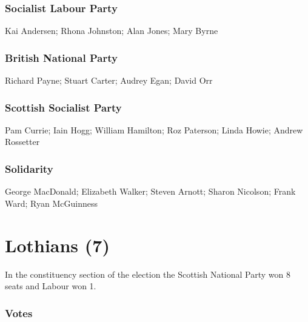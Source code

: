 \begin{resultsiii}
\subsubsection*{Socialist Labour Party}
Kai Andersen; Rhona Johnston; Alan Jones; Mary Byrne
\subsubsection*{British National Party}
Richard Payne; Stuart Carter; Audrey Egan; David Orr
\subsubsection*{Scottish Socialist Party}
Pam Currie; Iain Hogg; William Hamilton; Roz Paterson; Linda Howie; Andrew Rossetter
\subsubsection*{Solidarity}
George MacDonald; Elizabeth Walker; Steven Arnott; Sharon Nicolson; Frank Ward; Ryan McGuinness
\end{resultsiii}

\vfill\eject

\section[Lothians]{Lothians (7)}

In the constituency section of the election the Scottish National Party won 8 seats and Labour won 1.

\vfill

\subsubsection*{Votes}

